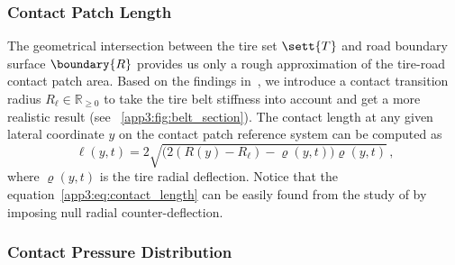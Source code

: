 \subsubsection{Contact Patch Length}
\label{app3:sec:contact_patch}

The geometrical intersection between the tire set $\sett{T}$ and road boundary surface $\boundary{R}$ provides us only a rough approximation of the tire-road contact patch area. Based on the findings in~\cite{koutny2007geometry, rhyne2005development}, we introduce a contact transition radius $R_\ell \in \mathbb{R}_{\geq 0}$ to take the tire belt stiffness into account and get a more realistic result (see \figurename~\ref{app3:fig:belt_section}). The contact length at any given lateral coordinate $y$ on the contact patch reference system can be computed as
%
\begin{equation}
  \ell(y,t) = 2\sqrt{\big(2(R(y)-R_\ell) - \varrho(y,t)\big)\varrho(y,t)} \, \text{,}
  \label{app3:eq:contact_length}
\end{equation}
%
where $\varrho(y,t)$ is the tire radial deflection. Notice that the equation~\eqref{app3:eq:contact_length} can be easily found from the study of \citet{rhyne2005development} by imposing null radial counter-deflection.

\subsubsection{Contact Pressure Distribution}
\label{app3:sec:pressure_distribution}

